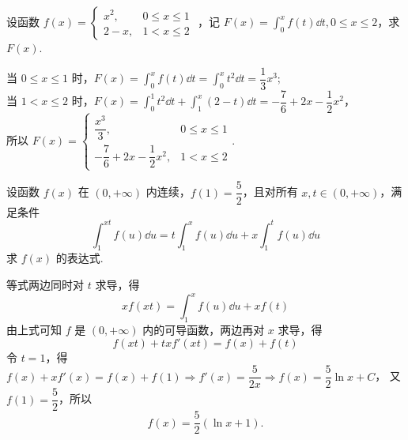 \begin{example}
    设函数 $ f(x)=\begin{cases}x^{2} ,&0 \leqslant x \leqslant 1 \\ 2-x ,&1<x \leqslant 2\end{cases} $ ，记
    $\displaystyle F(x)=\int_{0}^{x} f(t) \dd t, 0 \leqslant x \leqslant 2$，求 $F(x).$
\end{example}
\begin{solution}
    当 $0\leqslant x\leqslant 1$ 时，$\displaystyle F(x)=\int_{0}^{x}f(t)\dd t=\int_{0}^{x}t^2\dd t=\dfrac{1}{3}x^3$;\\
    当 $1< x\leqslant 2$ 时，$\displaystyle F(x)=\int_{0}^{1}t^2\dd t+\int_{1}^{x}(2-t)\dd t=-\dfrac{7}{6}+2x-\dfrac{1}{2}x^2$，\\
    所以 $\displaystyle F(x)=\begin{cases}\dfrac{x^3}{3} ,&0 \leqslant x \leqslant 1 \\[6pt] -\dfrac{7}{6}+2x-\dfrac{1}{2}x^2 ,&1<x \leqslant 2\end{cases}.$
\end{solution}

\begin{example}
    设函数 $ f(x) $ 在 $ (0,+\infty) $ 内连续，$ f(1)=\dfrac{5}{2} $，且对所有 $ x, t \in(0,+\infty) $，满足条件
    $$\int_{1}^{x t} f(u) \dd u=t \int_{1}^{x} f(u) \dd u+x \int_{1}^{t} f(u) \dd u $$
    求 $ f(x) $ 的表达式.
\end{example}
\begin{solution}
    等式两边同时对 $t$ 求导，得
    $$xf( xt) =\int _{1}^{x}f( u) \dd u+xf( t) $$
    由上式可知 $f$ 是 $(0,+\infty)$ 内的可导函数，两边再对 $x$ 求导，得
    $$f(xt)+txf'(xt)=f(x)+f(t)$$
    令 $t=1$，得 $f(x)+xf'(x)=f(x)+f(1)\Rightarrow f'(x)=\dfrac{5}{2x}\Rightarrow f(x)=\dfrac{5}{2}\ln x+C$，
    又 $f(1)=\dfrac{5}{2}$，所以 $$f(x)=\dfrac{5}{2}(\ln x+1).$$
\end{solution}

